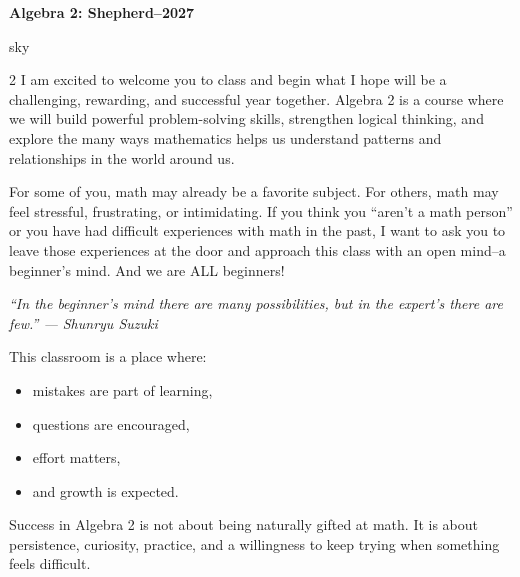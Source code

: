 \documentclass[12pt]{article}
\newcommand{\CourseName}{Algebra 2: Shepherd}
\newcommand{\SchoolYear}{2026--2027}
\begin{document}
    \begin{center}
        {\Large\bfseries \CourseName \quad \SchoolYear}
    \end{center}

    \renewcommand{\arraystretch}{1.6}
    \begin{skillbox}{sky}
        \setlength{\parskip}{0.6em}
        \setlength{\parindent}{0pt}
        \setlength{\columnsep}{1cm}
        \begin{multicols}{2}
            \raggedcolumns
            I am excited to welcome you to class and begin what I hope will be
            a challenging, rewarding, and successful year together. Algebra 2 is
            a course where we will build powerful problem-solving skills, strengthen
            logical thinking, and explore the many ways mathematics helps us
            understand patterns and relationships in the world around us.

            For some of you, math may already be a favorite subject. For others,
            math may feel stressful, frustrating, or intimidating. If you think
            you “aren’t a math person” or you have had difficult experiences
            with math in the past, I want to ask you to leave those experiences at the door
            and approach this class with an open mind--a beginner's mind.  And we are ALL
            beginners!

            \vspace{1em}
            \begin{center}
            \itshape
            “In the beginner’s mind there are many possibilities,
            but in the expert’s there are few.”
            \vspace{0.5em}
            --- Shunryu Suzuki
            \end{center}
            \vspace{1em}

            This classroom is a place where:
            \begin{itemize}
                \item mistakes are part of learning,
                \item questions are encouraged,
                \item effort matters,
                \item and growth is expected.
            \end{itemize}

            Success in Algebra 2 is not about being naturally gifted at math.
            It is about persistence, curiosity, practice, and a willingness
            to keep trying when something feels difficult.


\end{multicols}
\end{skillbox}
\end{document}
